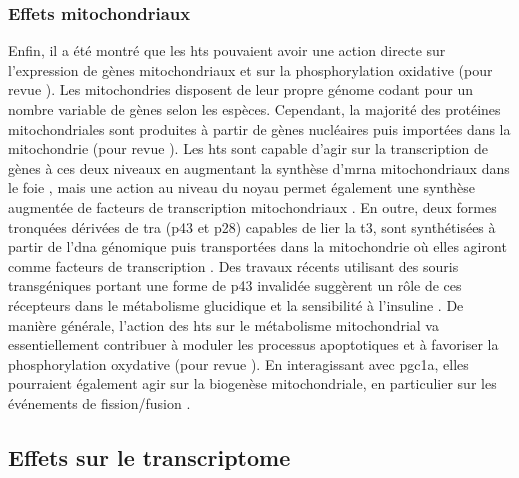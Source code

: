 \documentclass[../main.tex]{subfiles}
\begin{document}
\subsubsection{Effets mitochondriaux}
Enfin, il a été montré que les \glspl{ht} pouvaient avoir une action directe sur l'expression de gènes mitochondriaux et sur la phosphorylation oxidative (pour revue \citealp{Wrutniak-Cabello2001}).
Les mitochondries disposent de leur propre génome codant pour un nombre variable de gènes selon les espèces.
Cependant, la majorité des protéines mitochondriales sont produites à partir de gènes nucléaires puis importées dans la mitochondrie (pour revue \citealp{Schaffer2007}).
Les \glspl{ht} sont capable d'agir sur la transcription de gènes à ces deux niveaux en augmentant la synthèse d’\gls{mrna} mitochondriaux dans le foie \citep{Enriquez1999}, mais une action au niveau du noyau permet également une synthèse augmentée de facteurs de transcription mitochondriaux \citep{Garstka1994}.
En outre, deux formes tronquées dérivées de \gls{tra} (p43 et p28) capables de lier la \gls{t3}, sont synthétisées à partir de l'\gls{dna} génomique puis transportées dans la mitochondrie où elles agiront comme facteurs de transcription \citep{Wrutniak1995}.
Des travaux récents utilisant des souris transgéniques portant une forme de p43 invalidée suggèrent un rôle de ces récepteurs dans le métabolisme glucidique et la sensibilité à l'insuline \citep{Bertrand2013}.
De manière générale, l'action des \glspl{ht} sur le métabolisme mitochondrial va essentiellement contribuer à moduler les processus apoptotiques et à favoriser la phosphorylation oxydative (pour revue \citealp{Psarra2008}).
En interagissant avec \gls{pgc1a}, elles pourraient également agir sur la biogenèse mitochondriale, en particulier sur les événements de fission/fusion \citep{Ventura-Clapier2008}.


\subsection{Effets sur le transcriptome}
\end{document}
